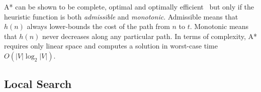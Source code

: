 A* can be shown to be complete, optimal and optimally
efficient~\citep{dechter85} but only if the heuristic function is both
\emph{admissible} and \emph{monotonic}. Admissible means that $h(n)$ always
lower-bounds the cost of the path from $n$ to $t$. Monotonic means that $h(n)$
never decreases along any particular path.
In terms of complexity, A* requires only linear space and computes a solution in 
worst-case time $O(|V|\log_2{|V|})$.

\subsection{Local Search}
\label{cha::lit::search::local}

